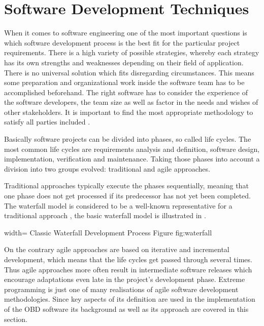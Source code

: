 
\chapter{Software Development Techniques}
\label{sec:SDT}

When it comes to software engineering one of the most important questions is which software development process 
is the best fit for the particular project requirements. There is a high variety of possible strategies, whereby 
each strategy has its own strengths and weaknesses depending on their field of application. There is no universal 
solution which fits disregarding circumstances. This means some preparation and 
organizational work inside the software team has to be accomplished beforehand. The right software 
has to consider the experience of the software developers, the team size as well as factor in the needs and wishes 
of other stakeholders. It is important to find the most appropriate methodology to satisfy all parties included \cite{BECK}.

Basically software projects can be divided into phases, so called life cycles. The most common life cycles are 
requirements analysis and definition, software design, implementation, verification and maintenance. Taking those 
phases into account a division into two groups evolved: traditional and agile approaches.

Traditional approaches typically execute the phases sequentially, meaning that one phase does not get processed if 
its predecessor has not yet been completed. The waterfall model is considered to be a well-known representative for a traditional approach \cite{WATERFALL},
the basic waterfall model is illustrated in .

 {width=\textwidth}%
 {Classic Waterfall Development Process }%
 {Figure}%
 {fig:waterfall}%

On the contrary agile approaches are based on iterative and incremental development, which means that the life cycles 
get passed through several times. Thus agile approaches more often result in intermediate software releases which 
encourage adaptations even late in the project’s development phase. Extreme programming is just one of many realisations 
of agile software development methodologies. Since key aspects of its definition are used in the implementation of the OBD 
software its background as well as its approach are covered in this section. 

